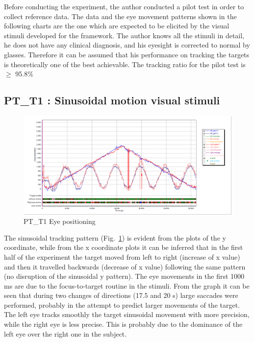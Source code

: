 Before conducting the experiment, the author conducted a pilot test in order to collect reference data. The data and the eye movement patterns shown in the following charts are the one which are expected to be elicited by the visual stimuli developed for the framework.
The author knows all the stimuli in detail, he does not have any clinical diagnosis, and his eyesight is corrected to normal by glasses. Therefore it can be assumed that his performance on tracking the targets is theoretically one of the best achievable. The tracking ratio for the pilot test is \(\geq\) 95.8\% 

\subsection{PT\_T1 : Sinusoidal motion visual stimuli}
\label{sec:PT_T1}

\begin{figure}[t]
  \centering
  \includegraphics[width=.8\textwidth]{figures/graphs/PT_T1(sinusoid)_XY.png}
  \caption[PT\_T1 Eye positioning]{PT\_T1 Eye positioning}
  \label{fig:PT_T1_pos}
\end{figure}

The sinusoidal tracking pattern (Fig.~\ref{fig:PT_T1_pos}) is evident from the plots of the y coordinate, while from the x coordinate plots it can be inferred that in the first half of the experiment the target moved from left to right (increase of x value) and then it travelled backwards (decrease of x value) following the same pattern (no disruption of the sinusoidal y pattern). The eye movements in the first 1000 ms are due to the focus-to-target routine in the stimuli. From the graph it can be seen that during two changes of directions (17.5 and 20 s) large saccades were performed, probably in the attempt to predict larger movements of the target. The left eye tracks smoothly the target sinusoidal movement with more precision, while the right eye is less precise. This is probably due to the dominance of the left eye over the right one in the subject.

